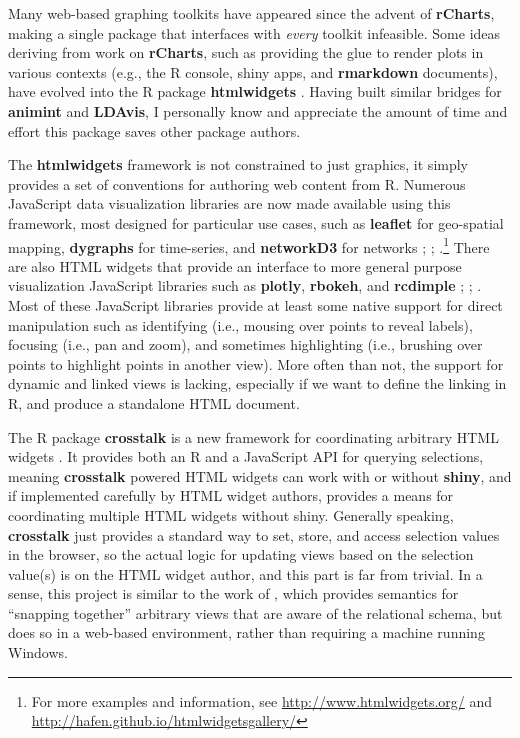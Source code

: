 \documentclass[11pt]{isuthesis}
\begin{document}
Many web-based graphing toolkits have appeared since the advent of
\textbf{rCharts}, making a single package that interfaces with
\emph{every} toolkit infeasible. Some ideas deriving from work on
\textbf{rCharts}, such as providing the glue to render plots in various
contexts (e.g., the R console, shiny apps, and \textbf{rmarkdown}
documents), have evolved into the R package \textbf{htmlwidgets}
\citep{htmlwidgets}. Having built similar bridges for \textbf{animint}
and \textbf{LDAvis}, I personally know and appreciate the amount of time
and effort this package saves other package authors.

The \textbf{htmlwidgets} framework is not constrained to just graphics,
it simply provides a set of conventions for authoring web content from
R. Numerous JavaScript data visualization libraries are now made
available using this framework, most designed for particular use cases,
such as \textbf{leaflet} for geo-spatial mapping, \textbf{dygraphs} for
time-series, and \textbf{networkD3} for networks \citep{leaflet};
\citep{dygraphs}; \citep{networkD3}.\footnote{For more examples and
  information, see \url{http://www.htmlwidgets.org/} and
  \url{http://hafen.github.io/htmlwidgetsgallery/}} There are also HTML
widgets that provide an interface to more general purpose visualization
JavaScript libraries such as \textbf{plotly}, \textbf{rbokeh}, and
\textbf{rcdimple} \citep{plotly}; \citep{rbokeh}; \citep{rcdimple}. Most
of these JavaScript libraries provide at least some native support for
direct manipulation such as identifying (i.e., mousing over points to
reveal labels), focusing (i.e., pan and zoom), and sometimes
highlighting (i.e., brushing over points to highlight points in another
view). More often than not, the support for dynamic and linked views is
lacking, especially if we want to define the linking in R, and produce a
standalone HTML document.

The R package \textbf{crosstalk} is a new framework for coordinating
arbitrary HTML widgets \citep{crosstalk}. It provides both an R and a
JavaScript API for querying selections, meaning \textbf{crosstalk}
powered HTML widgets can work with or without \textbf{shiny}, and if
implemented carefully by HTML widget authors, provides a means for
coordinating multiple HTML widgets without shiny. Generally speaking,
\textbf{crosstalk} just provides a standard way to set, store, and
access selection values in the browser, so the actual logic for updating
views based on the selection value(s) is on the HTML widget author, and
this part is far from trivial. In a sense, this project is similar to
the work of \citet{North:1999vi}, which provides semantics for
``snapping together'' arbitrary views that are aware of the relational
schema, but does so in a web-based environment, rather than requiring a
machine running Windows.
\end{document}
